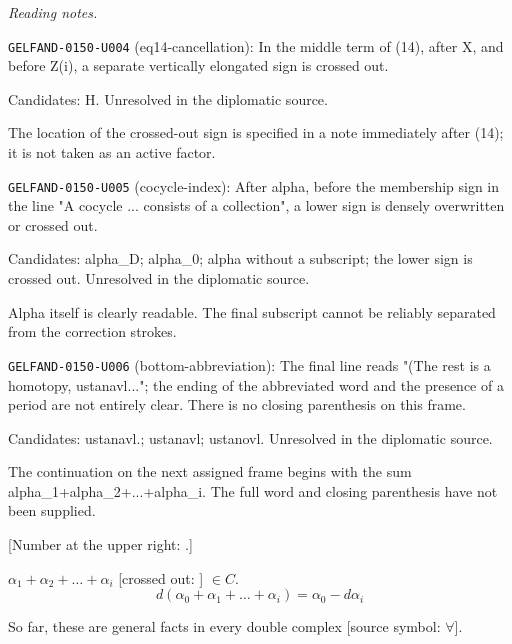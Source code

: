 \par\smallskip\noindent\textit{Reading notes.}\par
\noindent\texttt{GELFAND-0150-U004} (eq14-cancellation): In the middle term of (14), after X, and before Z(i), a separate vertically elongated sign is crossed out.\par
Candidates: H. Unresolved in the diplomatic source.\par
The location of the crossed-out sign is specified in a note immediately after (14); it is not taken as an active factor.\par
\noindent\texttt{GELFAND-0150-U005} (cocycle-index): After alpha, before the membership sign in the line "A cocycle ... consists of a collection", a lower sign is densely overwritten or crossed out.\par
Candidates: alpha\_D; alpha\_0; alpha without a subscript; the lower sign is crossed out. Unresolved in the diplomatic source.\par
Alpha itself is clearly readable. The final subscript cannot be reliably separated from the correction strokes.\par
\noindent\texttt{GELFAND-0150-U006} (bottom-abbreviation): The final line reads "(The rest is a homotopy, ustanavl..."; the ending of the abbreviated word and the presence of a period are not entirely clear. There is no closing parenthesis on this frame.\par
Candidates: ustanavl.; ustanavl; ustanovl. Unresolved in the diplomatic source.\par
The continuation on the next assigned frame begins with the sum alpha\_1+alpha\_2+...+alpha\_i. The full word and closing parenthesis have not been supplied.\par


[Number at the upper right: .]

$\alpha_1+\alpha_2+\ldots+\alpha_i$
[crossed out: ]
$\in C$.
\begin{equation*}
d(\alpha_0+\alpha_1+\ldots+\alpha_i)=\alpha_0-d\alpha_i\tag{19}
\end{equation*}

So far, these are general facts in every double complex [source symbol: $\forall$].

